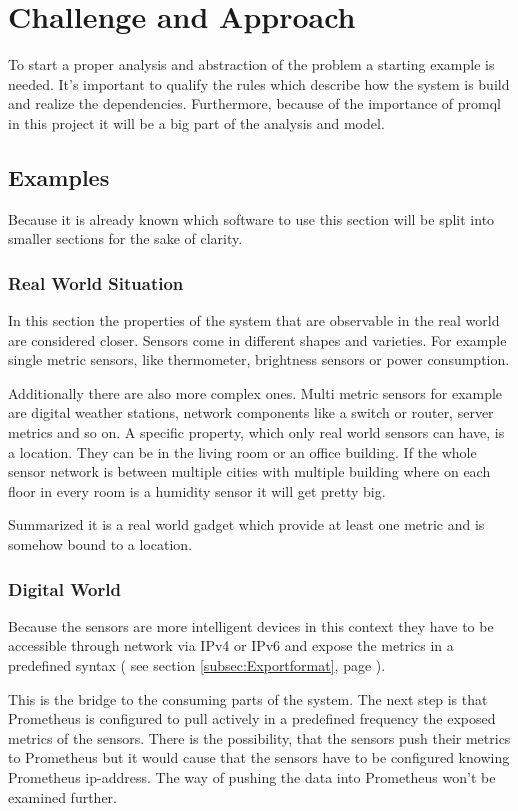 \chapter{Challenge and Approach}
\label{chapter:bestandsaufnahme}
To start a proper analysis and abstraction of the problem a starting example is needed. It's important to qualify the rules which describe how the system is build and realize the dependencies. Furthermore, because of the importance of \gls{promql} in this project it will be a big part of the analysis and model.
\section{Examples}
Because it is already known which software to use this section will be split into smaller sections for the sake of clarity. 

\subsection{Real World Situation}
In this section the properties of the system that are observable in the real world are considered closer. Sensors come in different shapes and varieties. For example single metric sensors, like thermometer, brightness sensors or power consumption. 

Additionally there are also more complex ones. Multi metric sensors for example are digital weather stations, network components like a switch or router, server metrics and so on. A specific property, which only real world sensors can have, is a location. They can be in the living room or an office building. If the whole sensor network is between multiple cities with multiple building where on each floor in every room is a humidity sensor it will get pretty big.

Summarized it is a real world gadget which provide at least one metric and is somehow bound to a location.

\subsection{Digital World}
Because the sensors are more intelligent devices in this context they have to be accessible through network via \gls{IPv4} or \gls{IPv6} and expose the metrics in a predefined syntax ( see section \ref{subsec:Exportformat}, page \pageref{subsec:Exportformat} ). 

This is the bridge to the consuming parts of the system. The next step is that Prometheus is configured to pull actively in a predefined frequency the exposed metrics of the sensors. There is the possibility, that the sensors push their metrics to Prometheus but it would cause that the sensors have to be configured knowing  Prometheus \gls{ip-address}. The way of pushing the data into Prometheus won't be examined further.

